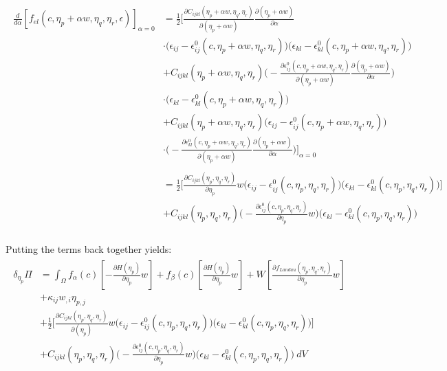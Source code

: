 \documentclass[11pt]{article}
\renewcommand{\=}[1]{\stackrel{#1}{=}} %
\theoremstyle{definition}
\theoremstyle{remark}
\begin{document}
\begin{align}
\begin{split}
\frac{d}{d\alpha} \left[ f_{el}(c,\eta_p+\alpha w,\eta_q,\eta_r,\epsilon)\right]_{\alpha=0} &= \frac{1}{2}  \bigg[  \frac{\partial C_{ijkl}(\eta_p+\alpha w,\eta_q,\eta_r)}{\partial (\eta_p + \alpha w)} \frac{\partial(\eta_p + \alpha w)}{\partial \alpha} \\ 
&\cdot\big (\epsilon_{ij}-\epsilon_{ij}^0 (c,\eta_p+\alpha w,\eta_q,\eta_r)\big) \big(\epsilon_{kl}-\epsilon_{kl}^0 (c,\eta_p+\alpha w,\eta_q,\eta_r)\big) \\
&+ C_{ijkl}(\eta_p+\alpha w,\eta_q,\eta_r) \bigg (-\frac{\partial\epsilon_{ij}^0 (c,\eta_p+\alpha w,\eta_q,\eta_r)}{\partial (\eta_p + \alpha w)} \frac{\partial(\eta_p + \alpha w)}{\partial \alpha} \bigg) \\ &\cdot \big(\epsilon_{kl}-\epsilon_{kl}^0 (c,\eta_p+\alpha w,\eta_q,\eta_r)\big) \\
&+ C_{ijkl}(\eta_p+\alpha w,\eta_q,\eta_r)   \big(\epsilon_{ij}-\epsilon_{ij}^0 (c,\eta_p+\alpha w,\eta_q,\eta_r)\big) \\ 
&\cdot\bigg (-\frac{\partial\epsilon_{kl}^0 (c,\eta_p+\alpha w,\eta_q,\eta_r)}{\partial (\eta_p + \alpha w)} \frac{\partial(\eta_p + \alpha w)}{\partial \alpha} \bigg)\bigg]_{\alpha=0} \\
\\
&= \frac{1}{2}  \bigg[  \frac{\partial C_{ijkl}(\eta_p,\eta_q,\eta_r)}{\partial \eta_p} w \big(\epsilon_{ij}-\epsilon_{ij}^0 (c,\eta_p,\eta_q,\eta_r) \big) \big(\epsilon_{kl}-\epsilon_{kl}^0 (c,\eta_p,\eta_q,\eta_r) \big) \bigg] \\
&+ C_{ijkl}(\eta_p,\eta_q,\eta_r) \bigg (-\frac{\partial\epsilon_{ij}^0 (c,\eta_p,\eta_q,\eta_r)}{\partial \eta_p} w \bigg) \big(\epsilon_{kl}-\epsilon_{kl}^0 (c,\eta_p,\eta_q,\eta_r)\big) \\
\end{split}
\end{align}

Putting the terms back together yields:
\begin{gather}
\begin{split}
\delta_{\eta_p} \Pi  &=  \int_{\Omega}  f_{\alpha}(c) \left[  -\frac{\partial H(\eta_p)}{\partial \eta_p} w \right] +f_{\beta}(c) \left[  \frac{\partial H(\eta_p)}{\partial \eta_p } w \right] 
+ W \left[\frac{\partial f_{Landau}(\eta_p,\eta_q,\eta_r)}{\partial \eta_p} w \right] \\
&+ \kappa_{ij} w_{,i} \eta_{p,j} \\
&+\frac{1}{2}  \bigg[  \frac{\partial C_{ijkl}(\eta_p,\eta_q,\eta_r)}{\partial (\eta_p)} w \big(\epsilon_{ij}-\epsilon_{ij}^0 (c,\eta_p,\eta_q,\eta_r) \big) \big(\epsilon_{kl}-\epsilon_{kl}^0 (c,\eta_p,\eta_q,\eta_r) \big) \bigg] \\
&+ C_{ijkl}(\eta_p,\eta_q,\eta_r) \bigg (-\frac{\partial\epsilon_{ij}^0 (c,\eta_p,\eta_q,\eta_r)}{\partial \eta_p} w \bigg) \big(\epsilon_{kl}-\epsilon_{kl}^0 (c,\eta_p,\eta_q,\eta_r)\big)  ~dV  
\end{split}
\end{gather}
\end{document}
